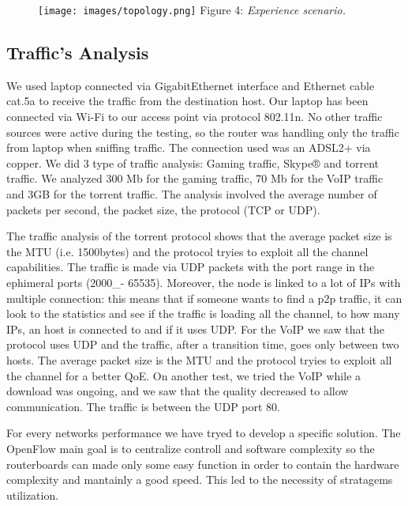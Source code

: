 \documentclass[article,10pt]{IEEEtran}
\begin{document}
  \begin{figure}[!h]
 \centering
 \texttt{[image: images/topology.png]}
 {Figure 4: \emph{Experience scenario.}}
 \label{fig:topo}
  \end{figure}
 
 
\subsection{Traffic's Analysis}\label{subsec:traf}
We used laptop connected via
GigabitEthernet interface and Ethernet cable cat.5a to receive the traffic from the destination host.
Our laptop has been connected via Wi-Fi to our access point via protocol 802.11n.
No other traffic sources were active during the testing, so the router was handling only
the traffic from laptop when sniffing traffic. The connection used was an ADSL2+ via copper.
We did 3 type of traffic analysis: Gaming traffic, Skype® and torrent traffic. We analyzed
300 Mb for the gaming traffic, 70 Mb for the VoIP traffic and 3GB for the torrent traffic.
The analysis involved the average number of packets per second, the packet size, the protocol (TCP or UDP).

The traffic analysis of the torrent protocol shows that the average packet size is the MTU
(i.e. 1500bytes) and the protocol tryies to exploit all the channel capabilities. The traffic
is made via UDP packets with the port range in the ephimeral ports (2000_- 65535).
Moreover, the node is linked to a lot of IPs with multiple connection: this means that
if someone wants to find a p2p traffic, it can look to the statistics and see if the traffic is loading all the channel,
to how many IPs, an host is connected to and if it uses UDP.
For the VoIP we saw that the protocol uses UDP and the traffic, after a transition time, goes only between two hosts.
The average packet size is the MTU and the protocol tryies to exploit all the channel for a better QoE.
On another test, we tried the VoIP while a download was ongoing, and we saw that the quality
decreased to allow communication. The traffic is between the UDP port 80.

  For every networks performance we have tryed to develop a specific solution. The OpenFlow main goal is to centralize controll and software
  complexity so the routerboards can made only some easy function in order to contain the hardware complexity and mantainly a good speed\cite{qos_paper}.
  This led to the necessity of stratagems utilization.
  
\end{document}
